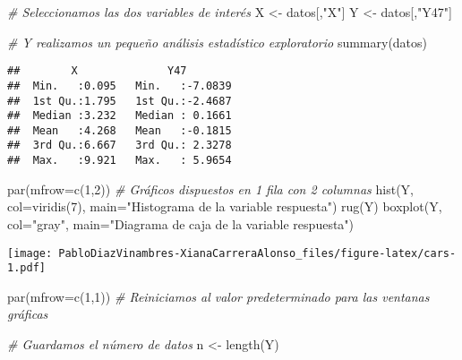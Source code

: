 \documentclass[
]{article}
\newenvironment{Shaded}{\begin{snugshade}}{\end{snugshade}}
\newcommand{\AttributeTok}[1]{\textcolor[rgb]{0.77,0.63,0.00}{#1}}
\newcommand{\CommentTok}[1]{\textcolor[rgb]{0.56,0.35,0.01}{\textit{#1}}}
\newcommand{\DecValTok}[1]{\textcolor[rgb]{0.00,0.00,0.81}{#1}}
\newcommand{\FunctionTok}[1]{\textcolor[rgb]{0.00,0.00,0.00}{#1}}
\newcommand{\NormalTok}[1]{#1}
\newcommand{\OtherTok}[1]{\textcolor[rgb]{0.56,0.35,0.01}{#1}}
\newcommand{\StringTok}[1]{\textcolor[rgb]{0.31,0.60,0.02}{#1}}
\begin{document}
\begin{Shaded}
\begin{Highlighting}[]
\CommentTok{\# Seleccionamos las dos variables de interés}
\NormalTok{X }\OtherTok{\textless{}{-}}\NormalTok{ datos[,}\StringTok{"X"}\NormalTok{]}
\NormalTok{Y }\OtherTok{\textless{}{-}}\NormalTok{ datos[,}\StringTok{"Y47"}\NormalTok{]}

\CommentTok{\# Y realizamos un pequeño análisis estadístico exploratorio}
\FunctionTok{summary}\NormalTok{(datos)}
\end{Highlighting}
\end{Shaded}

\begin{verbatim}
##        X              Y47         
##  Min.   :0.095   Min.   :-7.0839  
##  1st Qu.:1.795   1st Qu.:-2.4687  
##  Median :3.232   Median : 0.1661  
##  Mean   :4.268   Mean   :-0.1815  
##  3rd Qu.:6.667   3rd Qu.: 2.3278  
##  Max.   :9.921   Max.   : 5.9654
\end{verbatim}

\begin{Shaded}
\begin{Highlighting}[]
\FunctionTok{par}\NormalTok{(}\AttributeTok{mfrow=}\FunctionTok{c}\NormalTok{(}\DecValTok{1}\NormalTok{,}\DecValTok{2}\NormalTok{))     }\CommentTok{\# Gráficos dispuestos en 1 fila con 2 columnas}
\FunctionTok{hist}\NormalTok{(Y, }\AttributeTok{col=}\FunctionTok{viridis}\NormalTok{(}\DecValTok{7}\NormalTok{), }\AttributeTok{main=}\StringTok{"Histograma de la variable respuesta"}\NormalTok{)}
\FunctionTok{rug}\NormalTok{(Y)}
\FunctionTok{boxplot}\NormalTok{(Y, }\AttributeTok{col=}\StringTok{"gray"}\NormalTok{, }\AttributeTok{main=}\StringTok{"Diagrama de caja de la variable respuesta"}\NormalTok{)}
\end{Highlighting}
\end{Shaded}

\texttt{[image: PabloDiazVinambres-XianaCarreraAlonso\_files/figure-latex/cars-1.pdf]}

\begin{Shaded}
\begin{Highlighting}[]
\FunctionTok{par}\NormalTok{(}\AttributeTok{mfrow=}\FunctionTok{c}\NormalTok{(}\DecValTok{1}\NormalTok{,}\DecValTok{1}\NormalTok{))     }\CommentTok{\# Reiniciamos al valor predeterminado para las ventanas gráficas}



\CommentTok{\# Guardamos el número de datos}
\NormalTok{n }\OtherTok{\textless{}{-}} \FunctionTok{length}\NormalTok{(Y)}
\end{Highlighting}
\end{Shaded}
\end{document}
